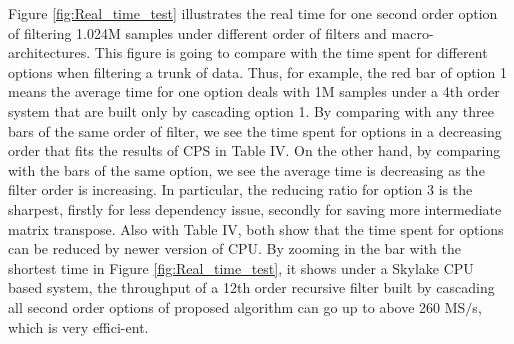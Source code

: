 Figure \ref{fig:Real_time_test} illustrates the real time for one second order option
of filtering 1.024M samples under different order of filters and macro-architectures.
This figure is going to compare with the time spent for different options when filtering 
a trunk of data. Thus, for example, the red bar of option 1 means the average time
for one option deals with 1M samples under a 4th order system
that are built only by cascading option 1.
By comparing with any three bars of the same order of filter,
we see the time spent for options in a decreasing order that fits the results of CPS in Table IV.
On the other hand, by comparing with the bars of the same option,
we see the average time is decreasing as the filter order is increasing.
In particular, the reducing ratio for option 3 is the sharpest, firstly for less dependency issue,
secondly for saving more intermediate matrix transpose.
Also with Table IV, both show that the time spent for options
can be reduced by newer version of CPU.
By zooming in the bar with the shortest time in Figure \ref{fig:Real_time_test},
it shows under a Skylake CPU based system, 
the throughput of a 12th order recursive filter built by
cascading all second order options of proposed algorithm 
can go up to above 260 MS$\slash$s, which is very effici-ent.











